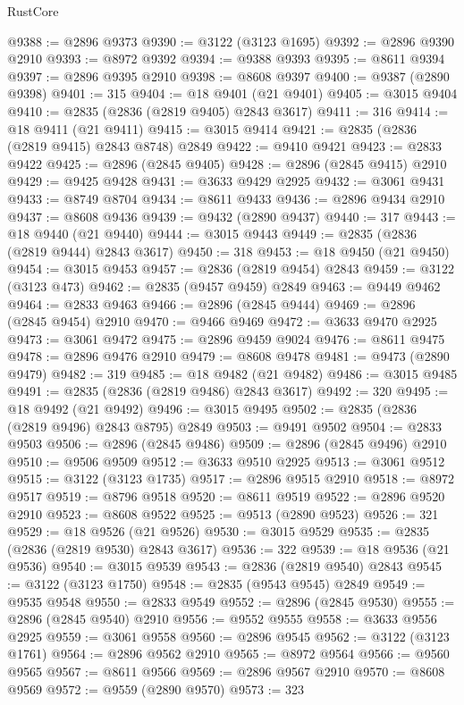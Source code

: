\begin{lexlean}{RustCore}
\begin{coremodule}
@9388 := @2896 @9373
@9390 := @3122 (@3123 @1695)
@9392 := @2896 @9390 @2910
@9393 := @8972 @9392
@9394 := @9388 @9393
@9395 := @8611 @9394
@9397 := @2896 @9395 @2910
@9398 := @8608 @9397
@9400 := @9387 (@2890 @9398)
@9401 := 315
@9404 := @18 @9401 (@21 @9401)
@9405 := @3015 @9404
@9410 := @2835 (@2836 (@2819 @9405) @2843 @3617)
@9411 := 316
@9414 := @18 @9411 (@21 @9411)
@9415 := @3015 @9414
@9421 := @2835 (@2836 (@2819 @9415) @2843 @8748) @2849
@9422 := @9410 @9421
@9423 := @2833 @9422
@9425 := @2896 (@2845 @9405)
@9428 := @2896 (@2845 @9415) @2910
@9429 := @9425 @9428
@9431 := @3633 @9429 @2925
@9432 := @3061 @9431
@9433 := @8749 @8704
@9434 := @8611 @9433
@9436 := @2896 @9434 @2910
@9437 := @8608 @9436
@9439 := @9432 (@2890 @9437)
@9440 := 317
@9443 := @18 @9440 (@21 @9440)
@9444 := @3015 @9443
@9449 := @2835 (@2836 (@2819 @9444) @2843 @3617)
@9450 := 318
@9453 := @18 @9450 (@21 @9450)
@9454 := @3015 @9453
@9457 := @2836 (@2819 @9454) @2843
@9459 := @3122 (@3123 @473)
@9462 := @2835 (@9457 @9459) @2849
@9463 := @9449 @9462
@9464 := @2833 @9463
@9466 := @2896 (@2845 @9444)
@9469 := @2896 (@2845 @9454) @2910
@9470 := @9466 @9469
@9472 := @3633 @9470 @2925
@9473 := @3061 @9472
@9475 := @2896 @9459 @9024
@9476 := @8611 @9475
@9478 := @2896 @9476 @2910
@9479 := @8608 @9478
@9481 := @9473 (@2890 @9479)
@9482 := 319
@9485 := @18 @9482 (@21 @9482)
@9486 := @3015 @9485
@9491 := @2835 (@2836 (@2819 @9486) @2843 @3617)
@9492 := 320
@9495 := @18 @9492 (@21 @9492)
@9496 := @3015 @9495
@9502 := @2835 (@2836 (@2819 @9496) @2843 @8795) @2849
@9503 := @9491 @9502
@9504 := @2833 @9503
@9506 := @2896 (@2845 @9486)
@9509 := @2896 (@2845 @9496) @2910
@9510 := @9506 @9509
@9512 := @3633 @9510 @2925
@9513 := @3061 @9512
@9515 := @3122 (@3123 @1735)
@9517 := @2896 @9515 @2910
@9518 := @8972 @9517
@9519 := @8796 @9518
@9520 := @8611 @9519
@9522 := @2896 @9520 @2910
@9523 := @8608 @9522
@9525 := @9513 (@2890 @9523)
@9526 := 321
@9529 := @18 @9526 (@21 @9526)
@9530 := @3015 @9529
@9535 := @2835 (@2836 (@2819 @9530) @2843 @3617)
@9536 := 322
@9539 := @18 @9536 (@21 @9536)
@9540 := @3015 @9539
@9543 := @2836 (@2819 @9540) @2843
@9545 := @3122 (@3123 @1750)
@9548 := @2835 (@9543 @9545) @2849
@9549 := @9535 @9548
@9550 := @2833 @9549
@9552 := @2896 (@2845 @9530)
@9555 := @2896 (@2845 @9540) @2910
@9556 := @9552 @9555
@9558 := @3633 @9556 @2925
@9559 := @3061 @9558
@9560 := @2896 @9545
@9562 := @3122 (@3123 @1761)
@9564 := @2896 @9562 @2910
@9565 := @8972 @9564
@9566 := @9560 @9565
@9567 := @8611 @9566
@9569 := @2896 @9567 @2910
@9570 := @8608 @9569
@9572 := @9559 (@2890 @9570)
@9573 := 323

\end{coremodule}
\end{lexlean}

